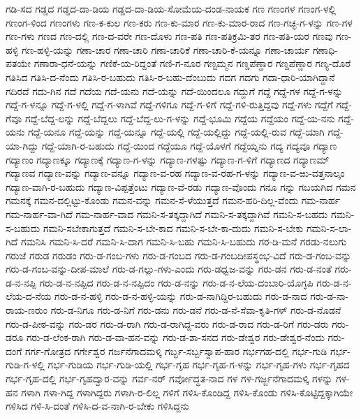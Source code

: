 ಗಡಿ-ಸದ
ಗಡ್ಡದ
ಗಡ್ಡದ-ದಾ-ಡಿಯ
ಗಡ್ಡದ-ದಾ-ಡಿಯ-ಸೋಮೆಯ-ದಂಡ-ನಾಯಕ
ಗಣ
ಗಣಂಗಳ
ಗಣಂಗ-ಳಲ್ಲಿ
ಗಣಂಗ-ಳಿಂದ
ಗಣಂಗಳು
ಗಣ-ಕ-ಕುಲ
ಗಣ-ಕರು
ಗಣ-ಕು-ಮಾರ
ಗಣ-ಕು-ಮಾರ-ರಾದ
ಗಣ-ಗಚ್ಛ-ಗ-ಳನ್ನು
ಗಣ-ಗಳ
ಗಣ-ಗಳು
ಗಣದ
ಗಣ-ದಲ್ಲಿ
ಗಣ-ದ-ವರೇ
ಗಣ-ದೊಳು
ಗಣ-ಪತಿ
ಗಣ-ಪತಿಕ್ರಮಿ-ತರ
ಗಣ-ಪತಿ-ಯರ
ಗಣವು
ಗಣ-ಹಳ್ಳಿ
ಗಣ-ಹಳ್ಳಿ-ಯನ್ನು
ಗಣಾ-ಚಾರ
ಗಣಾ-ಚಾರಿ
ಗಣಾ-ಚಾರಿಕೆ
ಗಣಾ-ಚಾರಿ-ಕೆ-ಯನ್ನೂ
ಗಣಾ-ಚಾರ್ಯ
ಗಣಾಧಿ-ಪತಯೇ
ಗಣಾರಾ-ಧನೆ-ಯನ್ನು
ಗಣಿಕೆ-ಯ-ರಿದ್ದಂತೆ
ಗಣಿ-ಗ-ನೂರ
ಗಣ್ಟಮ್ಮನ
ಗಣ್ಡಪೆಣ್ಡಾರ
ಗಣ್ದಪೆಣ್ಡಾರ
ಗಣ್ಯ-ದೊರೆ
ಗತಿಸಿದ
ಗತಿಸಿ-ದ-ನೆಂದು
ಗತಿಸಿ-ರ-ಬಹುದು
ಗತಿಸಿ-ರ-ಬಹು-ದೆಂಬುದು
ಗದಗ
ಗದಗು
ಗದಾ-ಧಾರಿ-ಯಾಗಿದ್ದಾನೆ
ಗದಿರದೆ
ಗದು-ಗಿನ
ಗದೆ
ಗದೆಯ
ಗದೆ-ಯನು
ಗದೆ-ಯನ್ನು
ಗದೆ-ಯಿಂದಲೂ
ಗದ್ದುಗೆ
ಗದ್ದೆ
ಗದ್ದೆ-ಗಳ
ಗದ್ದೆ-ಗ-ಳನ್ನು
ಗದ್ದೆ-ಗ-ಳನ್ನೂ
ಗದ್ದೆ-ಗ-ಳಲ್ಲಿ
ಗದ್ದೆ-ಗ-ಳಾಗಿವೆ
ಗದ್ದೆ-ಗಳಿಗೂ
ಗದ್ದೆ-ಗ-ಳಿಗೆ
ಗದ್ದೆ-ಗಳಿ-ರುತ್ತಿದ್ದವು
ಗದ್ದೆ-ಗಳು
ಗದ್ದೆಗೆ
ಗದ್ದೆ-ಗೆವೂ
ಗದ್ದೆ-ಬೆದ್ದ-ಲನ್ನು
ಗದ್ದೆ-ಬೆದ್ದಲು
ಗದ್ದೆ-ಬೆದ್ದ-ಲು-ಗ-ಳನ್ನು
ಗದ್ದೆ-ಭೂಮಿ
ಗದ್ದೆಯ
ಗದ್ದೆಯಂ
ಗದ್ದೆ-ಯ-ನನು
ಗದ್ದೆ-ಯನು
ಗದ್ದೆ-ಯನೂ
ಗದ್ದೆ-ಯನ್ನು
ಗದ್ದೆ-ಯನ್ನೂ
ಗದ್ದೆ-ಯಲ್ಲಿ
ಗದ್ದೆ-ಯಲ್ಲಿದ್ದು
ಗದ್ದೆ-ಯಲ್ಲಿ-ರುವ
ಗದ್ದೆ-ಯಾಗಿ
ಗದ್ದೆ-ಯಾ-ಗಿದ್ದು
ಗದ್ದೆ-ಯಾಗಿ-ರ-ಬಹುದು
ಗದ್ದೆ-ಯಿಂದ
ಗದ್ದೆಯೂ
ಗದ್ದೆ-ಯೊಳಗೆ
ಗದ್ದೆಯ್ನನು
ಗದ್ಯ
ಗದ್ಯವೂ
ಗದ್ಯಾಣ
ಗದ್ಯಾಣಂ
ಗದ್ಯಾಣಕ್ಕೂ
ಗದ್ಯಾಣಕ್ಕೆ
ಗದ್ಯಾಣ-ಗ-ಳನ್ನು
ಗದ್ಯಾಣ-ಗಳಷ್ಟು
ಗದ್ಯಾಣ-ಗ-ಳಿಗೆ
ಗದ್ಯಾಣದ
ಗದ್ಯಾಣಮ್
ಗದ್ಯಾಣವ
ಗದ್ಯಾಣ-ವನ್ನು
ಗದ್ಯಾಣ-ವನ್ನೂ
ಗದ್ಯಾಣ-ವ-ರಹ
ಗದ್ಯಾಣ-ವ-ರಹ-ಗ-ಳನ್ನು
ಗದ್ಯಾಣ-ವ-ಱು-ವತ್ತನಾಲ್ಕಂ
ಗದ್ಯಾಣ-ವಾಗಿ-ರ-ಬಹುದು
ಗದ್ಯಾಣ-ವಿಪ್ಪತ್ತೆಂಟು
ಗದ್ಯಾಣ-ವೆ-ರಡು
ಗದ್ಯಾಣ-ವೊಂದು
ಗನೂ
ಗನ್ನು
ಗಬಯಗಿದ
ಗಮನ
ಗಮನಕ್ಕೆ
ಗಮನ-ದಲ್ಲಿಟ್ಟು-ಕೊಂಡು
ಗಮನ-ವನ್ನು
ಗಮನ-ಸೆ-ಳೆಯುತ್ತದೆ
ಗಮನ-ಹರಿ-ದಿಲ್ಲ-ವೆಂದು
ಗಮ-ನಾರ್ಹ
ಗಮ-ನಾರ್ಹ-ವಾ-ಗಿದೆ
ಗಮ-ನಾರ್ಹ-ವಾದ
ಗಮನಿ-ಸ-ತಕ್ಕದ್ದಾಗಿದೆ
ಗಮನಿ-ಸ-ತಕ್ಕದ್ದಾಗಿವೆ
ಗಮನಿ-ಸ-ಬಹದು
ಗಮನಿ-ಸ-ಬಹುದು
ಗಮನಿ-ಸಬೇಕಾಗುತ್ತದೆ
ಗಮನಿ-ಸ-ಬೇ-ಕಾದ
ಗಮನಿ-ಸ-ಬೇ-ಕಾ-ದುದು
ಗಮನಿ-ಸ-ಬೇಕು
ಗಮನಿ-ಸ-ಲಾ-ಗಿದೆ
ಗಮನಿಸಿ
ಗಮನಿ-ಸಿ-ದರೆ
ಗಮನಿ-ಸಿ-ದಾಗ
ಗಮನಿ-ಸಿ-ಬಹು
ಗಮನಿ-ಸಿ-ಬಹುದು
ಗರ-ಡಿ-ಮನೆ
ಗರಡು-ನಲುಗು
ಗರುಜೆ
ಗರುಡ
ಗರುಡಂ
ಗರು-ಡ-ಗಂಬ-ಗಳು
ಗರು-ಡ-ಗಂಬದ
ಗರು-ಡ-ಗಂಬದೀಪಸ್ಥಂಭ-ವಿದೆ
ಗರು-ಡ-ಗಂಬ-ವನ್ನು
ಗರು-ಡ-ಗಂಬ-ವನ್ನು-ದೀಪ-ಮಾಲೆ
ಗರು-ಡ-ಗಲ್ಲು-ಗಳು-ಎಂದು
ಗರು-ಡಧ್ವಜ-ವನ್ನು
ಗರು-ಡನ
ಗರು-ಡ-ನಂತೆ
ಗರು-ಡ-ನ-ನಪ್ಪಿ
ಗರು-ಡ-ನ-ನಪ್ಪಿದ
ಗರು-ಡ-ನ-ನಪ್ಪಿದಂ
ಗರು-ಡ-ನನ್ನು
ಗರು-ಡ-ನ-ಲೆಯ-ದಂಬಾರಿ-ಯೊಗ್ಳಪಿ
ಗರು-ಡ-ನ-ಲೆಯ-ದ-ನೆಯ
ಗರು-ಡ-ನ-ಹಳ್ಳಿ
ಗರು-ಡ-ನ-ಹಳ್ಳಿ-ಯನ್ನು
ಗರು-ಡ-ನಾಗಿದ್ದಿರ-ಬಹುದು
ಗರು-ಡ-ನಾದ
ಗರು-ಡ-ನಾ-ರಾಯ-ಣರುಂ
ಗರು-ಡ-ನಿಗೂ
ಗರು-ಡ-ನಿಗೆ
ಗರು-ಡನು
ಗರು-ಡನೆ
ಗರು-ಡ-ನೆ-ಸೆವಾ-ಕೃತಿ-ಗಳ್
ಗರು-ಡ-ನೊಡನೆ
ಗರು-ಡ-ಪೀಠ-ವನ್ನು
ಗರು-ಡರ
ಗರು-ಡ-ರಾಗಿ
ಗರು-ಡ-ರಾಗಿದ್ದ-ವರು
ಗರು-ಡ-ರಾದ
ಗರು-ಡ-ರಿಗೆ
ಗರು-ಡರು
ಗರು-ಡರೂ
ಗರು-ಡ-ಲೆಂಕ-ರಾಗಿ
ಗರು-ಡ-ವಾ-ಹನ-ವನ್ನು
ಗರು-ಡ-ಶಾ-ಸನದ
ಗರು-ಡೇಶ್ವರ
ಗರು-ಡೇಶ್ವರ-ನೆಂದು
ಗರು-ದಂಗೆ
ಗರ್ಗ-ಗೋತ್ರದ
ಗರ್ಗೇಶ್ವರ
ಗರ್ಜನೆಗಾದಮಳ್ಕಿ
ಗರ್ಬ್ಭ-ಸರ್ಬ್ಬಸ್ವಾಪ-ಹಾರ
ಗರ್ಭಗಹ-ದಲ್ಲಿ
ಗರ್ಭ-ಗುಡಿ
ಗರ್ಭ-ಗುಡಿ-ಗ-ಳಲ್ಲಿ
ಗರ್ಭ-ಗುಡಿಯ
ಗರ್ಭ-ಗುಡಿ-ಯಲ್ಲಿ
ಗರ್ಭ-ಗೃಹ
ಗರ್ಭ-ಗೃಹ-ಗ-ಳನ್ನು
ಗರ್ಭ-ಗೃಹ-ಗಳು
ಗರ್ಭ-ಗೃಹದ
ಗರ್ಭ-ಗೃಹ-ದಲ್ಲಿ
ಗರ್ಭ-ಗೃಹದ್ವಾರ-ವನ್ನು
ಗರ್ವ-ನರ್
ಗರ್ವೋದ್ಧತ-ನಾದ
ಗಳ
ಗಳ-ಗರ್ಜ್ಜನೆಗಾದಮಳ್ಕಿ
ಗಳನ್ನು
ಗಳ-ಹನ
ಗಳಾಗಿ
ಗಳಾ-ಗಿದ್ದ
ಗಳಾಗಿದ್ದರು
ಗಳಾಗಿ-ರ-ಲಿಲ್ಲ
ಗಳಿಗೆ
ಗಳಿಸಿ-ಕೊಂಡಿದ್ದ
ಗಳಿಸಿ-ಕೊಂಡು
ಗಳಿಸಿ-ಕೊಟ್ಟಿದ್ದಕ್ಕಾಗಿಯೇ
ಗಳಿಸಿದ
ಗಳಿ-ಸಿ-ದಂತೆ
ಗಳಿಸಿ-ದ-ವ-ನಾಗಿ-ರ-ಬೇಕು
ಗಳಿಸಿದ್ದನು
